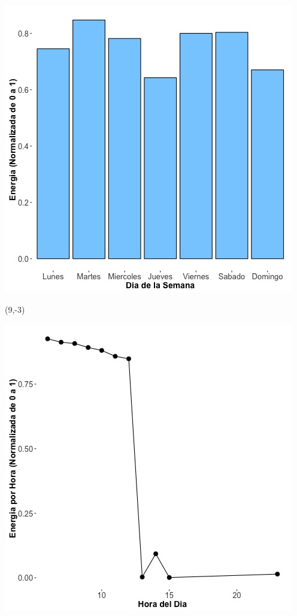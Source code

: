 \documentclass{article}\usepackage[]{graphicx}\usepackage[]{color}
\newenvironment{knitrout}{}{} %
\begin{document}
\begin{knitrout}
\color{fgcolor}
\includegraphics[scale=0.65]{figure/A28_day_of_week_plot} 
\end{knitrout}


 \begin{textblock}{1}(9,-3)
\begin{minipage}{20em}
\begingroup

\endgroup
\end{minipage}
\end{textblock}

 \vspace{2cm}

\begin{knitrout}
\color{fgcolor}
\includegraphics[scale=0.75]{figure/A28_fplot_norm_median} 
\end{knitrout}
\end{document}
